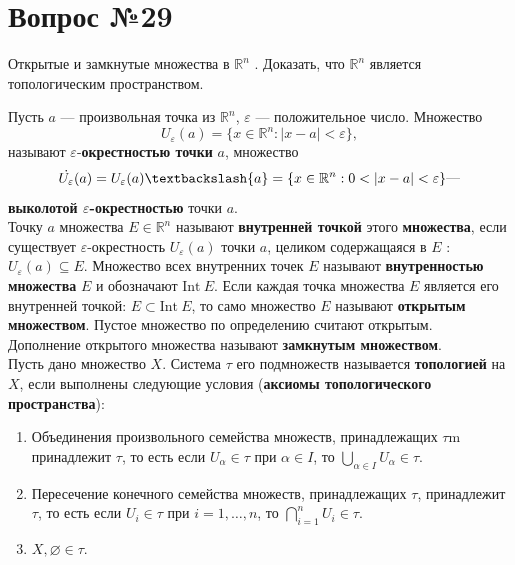 \documentclass[12pt]{report}
\numberwithin{equation}{section}
\begin{document}
\newpage \section{Вопрос №29} %
\begin{framed}
Открытые и замкнутые множества в $\mathbb{R}^n$ . Доказать, что $\mathbb{R}^n$ является топологическим пространством.
\end{framed}

Пусть $a$ --- произвольная точка из $\mathbb{R}^n$, $\varepsilon$ --- положительное число. Множество
\[ U_{\varepsilon} (a) = \{ x \in \mathbb{R}^n : | x- a| < \varepsilon \}, \]
называют $\varepsilon$-\textbf{окрестностью точки} $a$, множество
\[ \dot{U_{\varepsilon}}(a) = U_{\varepsilon}(a) \textbackslash \{ a \} = \{ x \in \mathbb{R}^n : 0 < | x - a | < \varepsilon\} \text{---}\]
\textbf{выколотой $\varepsilon$-окрестностью} точки $a$.\\

Точку $a$ множества $E \in \mathbb{R}^n$ называют \textbf{внутренней точкой} этого \textbf{множества}, если существует $\varepsilon$-окрестность $U_{\varepsilon}(a)$ точки $a$, целиком содержащаяся в $E$ : $U_{\varepsilon}(a) \subseteq E$. Множество всех внутренних точек $E$ называют \textbf{внутренностью множества} $E$ и обозначают $\mathrm{Int}~E$. Если каждая точка множества $E$ является его внутренней точкой: $E \subset \mathrm{Int}~E$, то само множество $E$ называют \textbf{открытым множеством}. Пустое множество по определению считают открытым.\\

Дополнение открытого множества называют \textbf{замкнутым множеством}.\\

Пусть дано множество $X$. Система $\tau$ его подмножеств называется \textbf{топологией} на $X$, если выполнены следующие условия (\textbf{аксиомы топологического пространcтва}):
\begin{enumerate}
\item Объединения произвольного семейства множеств, принадлежащих $\tau$m принадлежит $\tau$, то есть если $U_{\alpha} \in \tau$ при $\alpha \in I$, то $\bigcup\limits_{\alpha \in I} U_{\alpha} \in \tau$. \label{ax:29:1}
\item Пересечение конечного семейства множеств, принадлежащих $\tau$, принадлежит $\tau$, то есть если $U_i \in \tau$ при $i = 1, \ldots, n$, то $\bigcap\limits_{i = 1}^n U_i \in \tau$. \label{ax:29:2}
\item $X, \varnothing \in \tau$. \label{ax:29:3}
\end{enumerate}
\end{document}
